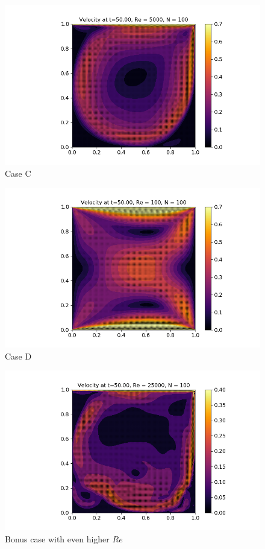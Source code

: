 \documentclass[10pt]{report}
\begin{document}
\begin{figure}[H]
    \centering
    \includegraphics[width = \textwidth]{figures/velocity_C.png}
    \caption{Case C}
    \label{caseC}
\end{figure}
\begin{figure}[H]
    \centering
    \includegraphics[width = \textwidth]{figures/velocity_D1.png}
    \caption{Case D}
    \label{caseD1}
\end{figure}
\begin{figure}[H]
    \centering
    \includegraphics[width = \textwidth]{figures/velocity_D.png}
    \caption{Bonus case with even higher $Re$}
    \label{caseD}
\end{figure}
\end{document}
